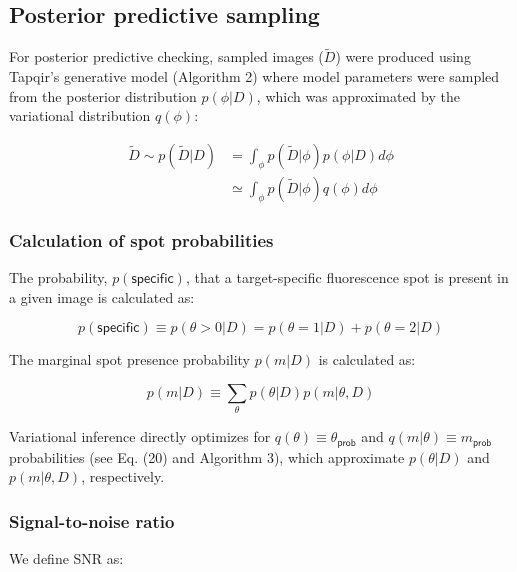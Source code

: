 \subsection*{Posterior predictive sampling}

For posterior predictive checking, sampled images ($\widetilde{D}$) were produced using Tapqir's generative model (Algorithm 2) where model parameters were sampled from the posterior distribution $p(\phi|D)$, which was approximated by the variational distribution $q(\phi)$:

\begin{equation}
\begin{aligned}
    \widetilde{D} \sim p(\widetilde{D} | D) &= \int_\phi p(\widetilde{D} | \phi) p(\phi | D) d\phi \\
    &\simeq \int_\phi p(\widetilde{D} | \phi) q(\phi) d\phi
\end{aligned}
\end{equation}

\subsubsection*{Calculation of spot probabilities}

The probability, $p(\mathsf{specific})$, that a target-specific fluorescence spot is present in a given image is calculated as:

\begin{equation}
    p(\mathsf{specific}) \equiv p(\theta > 0 | D) = p(\theta = 1 | D) + p(\theta = 2 | D)
\end{equation}

The marginal spot presence probability $p(m | D)$ is calculated as:

\begin{equation}
    p(m | D) \equiv \sum_\theta p(\theta | D) p(m | \theta, D)
\end{equation}

Variational inference directly optimizes for $q(\theta) \equiv \theta_\mathsf{prob}$ and $q(m | \theta) \equiv m_\mathsf{prob}$ probabilities (see Eq. (20) and Algorithm 3), which approximate $p(\theta | D)$ and $p(m | \theta, D)$, respectively. 

\subsubsection*{Signal-to-noise ratio}

We define SNR as:

